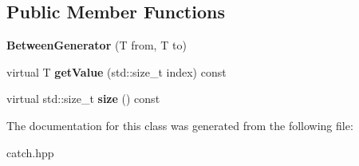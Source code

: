 \subsection*{Public Member Functions}
\begin{DoxyCompactItemize}
\item 
\mbox{\label{classCatch_1_1BetweenGenerator_a835a057d691ae37caef660624099b51c}} 
{\bfseries Between\+Generator} (T from, T to)
\item 
\mbox{\label{classCatch_1_1BetweenGenerator_a913f74bb0c23b3bc0127abfffdabbd94}} 
virtual T {\bfseries get\+Value} (std\+::size\+\_\+t index) const
\item 
\mbox{\label{classCatch_1_1BetweenGenerator_af65a1fe51f9b1106fc676e3dd189adb6}} 
virtual std\+::size\+\_\+t {\bfseries size} () const
\end{DoxyCompactItemize}


The documentation for this class was generated from the following file\+:\begin{DoxyCompactItemize}
\item 
catch.\+hpp\end{DoxyCompactItemize}
